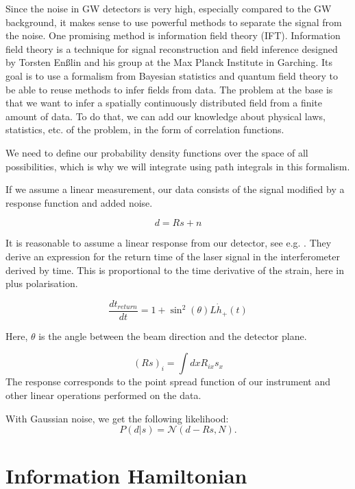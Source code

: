 Since the noise in GW detectors is very high, especially compared to the GW background, it makes sense to use powerful methods to separate the signal from the noise. One promising method is information field theory (IFT).
Information field theory is a technique for signal reconstruction
and field inference designed by Torsten Enßlin and his group at the 
Max Planck Institute in Garching.  Its goal is to use a formalism from Bayesian statistics and quantum field theory to be able to reuse methods to infer fields from data. The problem
at the base is that we want to infer a spatially continuously distributed field
from a finite amount of data. To do that, we can add our knowledge about 
physical laws, statistics, etc. of the problem, in the form of correlation functions.

We need to define our probability density functions over the space of all
possibilities, which is why we will integrate using path integrals in 
this formalism.

If we assume a linear measurement, our data consists of the signal modified by a response function and added noise. 

\begin{equation}
    d = R s + n
\end{equation}

It is reasonable to assume a linear response from our detector, see e.g. \cite{todo satyaprakash}. They derive an expression for the return time of the laser signal in the interferometer derived by time. This is proportional to the time derivative of the strain, here in plus polarisation. 

\begin{equation}
    \frac{dt_{return}}{dt}=1+\sin^2(\theta)L \dot{h}_+(t)
\end{equation}

Here, $\theta$ is the angle between the beam direction and the detector plane.

\begin{equation}
    (R s)_i = \int dx R_{ix} s_{x}
\end{equation}
The response corresponds to the point spread function of our instrument and
other linear operations performed on the data.

With Gaussian noise, we get the following likelihood:
\begin{equation}
    P(d|s) = \mathcal{N}(d-Rs, N) .
\end{equation}

\section{Information Hamiltonian}

